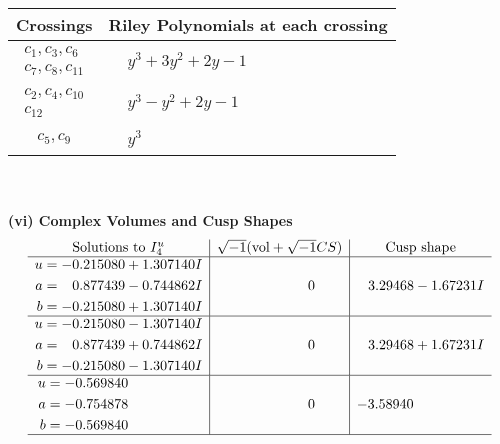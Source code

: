 \documentclass[1p]{elsarticle_modified}
\theoremstyle{definition}
\newcommand{\I}{\sqrt{-1}}
\begin{document}
\begin{tabular}{m{50pt}|m{274pt}}
Crossings & \hspace{64pt}Riley Polynomials at each crossing \\
\hline $$\begin{aligned}c_{1},c_{3},c_{6}\\c_{7},c_{8},c_{11}\end{aligned}$$&$\begin{aligned}
&y^3+3 y^2+2 y-1
\end{aligned}$\\
\hline $$\begin{aligned}c_{2},c_{4},c_{10}\\c_{12}\end{aligned}$$&$\begin{aligned}
&y^3- y^2+2 y-1
\end{aligned}$\\
\hline $$\begin{aligned}c_{5},c_{9}\end{aligned}$$&$\begin{aligned}
&y^3
\end{aligned}$\\
\hline
\end{tabular}\\~\\
\newpage\flushleft \textbf{(vi) Complex Volumes and Cusp Shapes}
$$\begin{array}{c|c|c}  
\text{Solutions to }I^u_{4}& \I (\text{vol} + \sqrt{-1}CS) & \text{Cusp shape}\\
 \hline 
\begin{aligned}
u &= -0.215080 + 1.307140 I \\
a &= \phantom{-}0.877439 - 0.744862 I \\
b &= -0.215080 + 1.307140 I\end{aligned}
 & \phantom{-0.000000 } 0 & \phantom{-}3.29468 - 1.67231 I \\ \hline\begin{aligned}
u &= -0.215080 - 1.307140 I \\
a &= \phantom{-}0.877439 + 0.744862 I \\
b &= -0.215080 - 1.307140 I\end{aligned}
 & \phantom{-0.000000 } 0 & \phantom{-}3.29468 + 1.67231 I \\ \hline\begin{aligned}
u &= -0.569840\phantom{ +0.000000I} \\
a &= -0.754878\phantom{ +0.000000I} \\
b &= -0.569840\phantom{ +0.000000I}\end{aligned}
 & \phantom{-0.000000 } 0 & -3.58940\phantom{ +0.000000I}\\
 \hline 
 \end{array}$$\newpage
\end{document}
